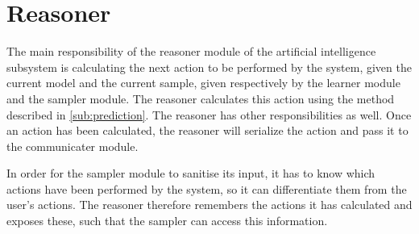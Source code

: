 \section{Reasoner}\label{sec:Reasoner}
The main responsibility of the reasoner module of the artificial intelligence subsystem is calculating the next action to be performed by the system, given the current model and the current sample, given respectively by the learner module and the sampler module.
The reasoner calculates this action using the method described in \cref{sub:prediction}.
The reasoner has other responsibilities as well. Once an action has been calculated, the reasoner will serialize the action and pass it to the communicater module.

In order for the sampler module to sanitise its input, it has to know which actions have been performed by the system, so it can differentiate them from the user's actions. The reasoner therefore remembers the actions it has calculated and exposes these, such that the sampler can access this information.
